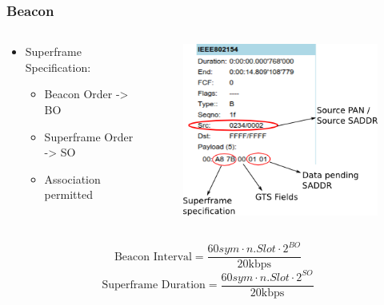 \begin{frame}[fragile]
  \frametitle{Beacon}
  \vspace{-2em}
  \begin{columns}
    \begin{column}{.58\linewidth}
      \begin{itemize}
	\item Superframe Specification:
	\begin{itemize}
	  \item Beacon Order -> BO
	  \item Superframe Order -> SO
	  \item Association permitted
	\end{itemize}
      \end{itemize}
    \end{column}
    \hfill
    \begin{column}{.4\linewidth}
      \begin{figure}
	\includegraphics[width=\textwidth]{img/beacon.png}
      \end{figure}
    \end{column}
  \end{columns}
  \vspace{1em}
  $$\text{Beacon Interval} = \frac{60sym \cdot n.Slot \cdot
2^{BO}}{20\text{kbps}}$$
  $$\text{Superframe Duration} = \frac{60sym \cdot n.Slot \cdot
2^{SO}}{20\text{kbps}}$$
\end{frame}


